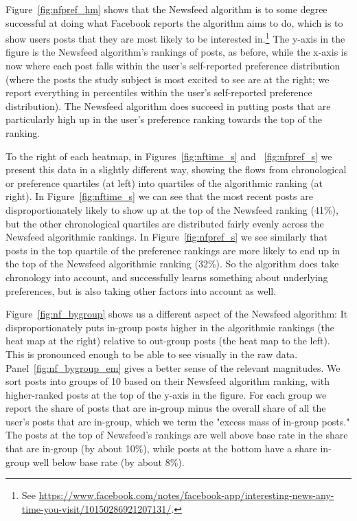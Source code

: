 \documentclass[12pt,letterpaper]{article}
\begin{document}
Figure~\ref{fig:nfpref_hm} shows that the Newsfeed algorithm is to some degree successful at doing what Facebook reports the algorithm aims to do, which is to show users posts that they are most likely to be interested in.\footnote{See \url{https://www.facebook.com/notes/facebook-app/interesting-news-any-time-you-visit/10150286921207131/}.} The y-axis in the figure is the Newsfeed algorithm's rankings of posts, as before, while the x-axis is now where each post falls within the user's self-reported preference distribution (where the posts the study subject is most excited to see are at the right; we report everything in percentiles within the user's self-reported preference distribution). The Newsfeed algorithm does succeed in putting posts that are particularly high up in the user's preference ranking towards the top of the ranking.

To the right of each heatmap, in Figures~\ref{fig:nftime_s} and ~\ref{fig:nfpref_s} we present this data in a slightly different way, showing the flows from chronological or preference quartiles (at left) into quartiles of the algorithmic ranking (at right). In Figure~\ref{fig:nftime_s} we can see that the most recent posts are disproportionately likely to show up at the top of the Newsfeed ranking (41\%), but the other chronological quartiles are distributed fairly evenly across the Newsfeed algorithmic rankings. In Figure~\ref{fig:nfpref_s} we see similarly that posts in the top quartile of the preference rankings are more likely to end up in the top of the Newsfeed algorithmic ranking (32\%). So the algorithm does take chronology into account, and successfully learns something about underlying preferences, but is also taking other factors into account as well.

Figure~\ref{fig:nf_bygroup} shows us a different aspect of the Newsfeed algorithm: It disproportionately puts in-group posts higher in the algorithmic rankings (the heat map at the right) relative to out-group posts (the heat map to the left). This is pronounced enough to be able to see visually in the raw data. Panel~\ref{fig:nf_bygroup_em} gives a better sense of the relevant magnitudes. We sort posts into groups of 10 based on their Newsfeed algorithm ranking, with higher-ranked posts at the top of the y-axis in the figure. For each group we report the share of posts that are in-group minus the overall share of all the user's posts that are in-group, which we term the "excess mass of in-group posts." The posts at the top of Newsfeed's rankings are well above base rate in the share that are in-group (by about 10\%), while posts at the bottom have a share in-group well below base rate (by about 8\%). 
\end{document}
